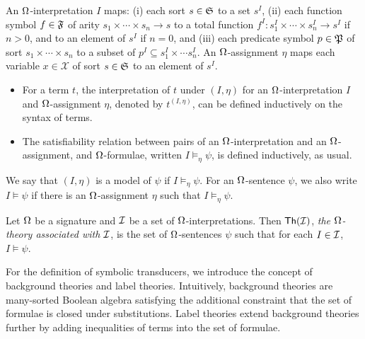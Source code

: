An $\Omega$-interpretation $I$ maps: (i) each sort $s \in {\mathfrak{S}}$  to a set $s^{I}$, (ii) each function symbol $f \in {\mathfrak{F}}$ of arity $s_1 \times \cdots \times s_n \rightarrow s$ to a total function $f^I: s_1^I \times \cdots \times s^I_n \rightarrow s^I$ if $n>0$, and to an element of $s^I$ if $n = 0$, and (iii) each predicate symbol $p \in {\mathfrak{P}}$ of sort $s_1 \times \cdots \times s_n$ to a  subset of $p^I \subseteq s^I_1 \times \cdots s^I_n$.
An $\Omega$-assignment $\eta$ maps each variable $x \in \mathcal{X}$ of sort $s \in {\mathfrak{S}}$ to an element of $s^I$.
\begin{itemize}
\item For a term $t$, the interpretation of $t$ under $(I, \eta)$ for an $\Omega$-interpretation $I$ and $\Omega$-assignment $\eta$, denoted by $t^{(I,\eta)}$, can be defined inductively on the syntax of terms.
\item The satisfiability relation between pairs of an $\Omega$-interpretation and an $\Omega$-assignment, and $\Omega$-formulae, written $I \models_{\eta} \psi$,
is defined inductively, as usual.
\end{itemize}
We say that $(I,\eta)$ is a model of $\psi$ if $I \models_{\eta} \psi$. For an $\Omega$-sentence $\psi$, we also write $I \models \psi$ if there is an $\Omega$-assignment $\eta$ such that $I \models_\eta \psi$.

Let $\Omega$ be a signature and $\mathcal{I}$ be a set of $\Omega$-interpretations. Then ${\sf Th}(\mathcal{I})$, \emph{the $\Omega$-theory associated with $\mathcal{I}$}, is the set of  $\Omega$-sentences $\psi$ such that for each $I \in \mathcal{I}$, $I \models \psi$.


For the definition of symbolic transducers, we introduce the concept of background theories and label theories. Intuitively, background theories are many-sorted Boolean algebra satisfying the additional constraint that the set of formulae is closed under substitutions. Label theories extend background theories further by adding inequalities of terms into the set of formulae.

